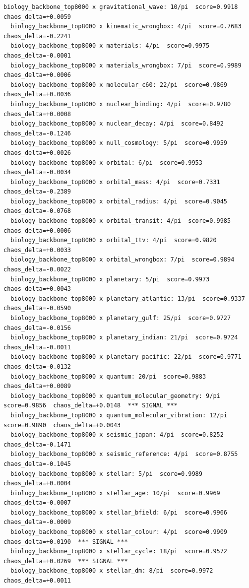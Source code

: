 \documentclass[11pt, letterpaper, openany]{book}
\begin{document}
\begin{empiricalbox}
\begin{lstlisting}[style=terminal]
  biology_backbone_top8000 x gravitational_wave: 10/pi  score=0.9918  chaos_delta=+0.0059
  biology_backbone_top8000 x kinematic_wrongbox: 4/pi  score=0.7683  chaos_delta=-0.2241
  biology_backbone_top8000 x materials: 4/pi  score=0.9975  chaos_delta=-0.0001
  biology_backbone_top8000 x materials_wrongbox: 7/pi  score=0.9989  chaos_delta=+0.0006
  biology_backbone_top8000 x molecular_c60: 22/pi  score=0.9869  chaos_delta=+0.0036
  biology_backbone_top8000 x nuclear_binding: 4/pi  score=0.9780  chaos_delta=+0.0008
  biology_backbone_top8000 x nuclear_decay: 4/pi  score=0.8492  chaos_delta=-0.1246
  biology_backbone_top8000 x null_cosmology: 5/pi  score=0.9959  chaos_delta=+0.0026
  biology_backbone_top8000 x orbital: 6/pi  score=0.9953  chaos_delta=-0.0034
  biology_backbone_top8000 x orbital_mass: 4/pi  score=0.7331  chaos_delta=-0.2389
  biology_backbone_top8000 x orbital_radius: 4/pi  score=0.9045  chaos_delta=-0.0768
  biology_backbone_top8000 x orbital_transit: 4/pi  score=0.9985  chaos_delta=+0.0006
  biology_backbone_top8000 x orbital_ttv: 4/pi  score=0.9820  chaos_delta=+0.0033
  biology_backbone_top8000 x orbital_wrongbox: 7/pi  score=0.9894  chaos_delta=-0.0022
  biology_backbone_top8000 x planetary: 5/pi  score=0.9973  chaos_delta=+0.0043
  biology_backbone_top8000 x planetary_atlantic: 13/pi  score=0.9337  chaos_delta=-0.0590
  biology_backbone_top8000 x planetary_gulf: 25/pi  score=0.9727  chaos_delta=-0.0156
  biology_backbone_top8000 x planetary_indian: 21/pi  score=0.9724  chaos_delta=-0.0011
  biology_backbone_top8000 x planetary_pacific: 22/pi  score=0.9771  chaos_delta=-0.0132
  biology_backbone_top8000 x quantum: 20/pi  score=0.9883  chaos_delta=+0.0089
  biology_backbone_top8000 x quantum_molecular_geometry: 9/pi  score=0.9856  chaos_delta=+0.0148  *** SIGNAL ***
  biology_backbone_top8000 x quantum_molecular_vibration: 12/pi  score=0.9890  chaos_delta=+0.0043
  biology_backbone_top8000 x seismic_japan: 4/pi  score=0.8252  chaos_delta=-0.1471
  biology_backbone_top8000 x seismic_reference: 4/pi  score=0.8755  chaos_delta=-0.1045
  biology_backbone_top8000 x stellar: 5/pi  score=0.9989  chaos_delta=+0.0004
  biology_backbone_top8000 x stellar_age: 10/pi  score=0.9969  chaos_delta=-0.0007
  biology_backbone_top8000 x stellar_bfield: 6/pi  score=0.9966  chaos_delta=-0.0009
  biology_backbone_top8000 x stellar_colour: 4/pi  score=0.9909  chaos_delta=+0.0190  *** SIGNAL ***
  biology_backbone_top8000 x stellar_cycle: 18/pi  score=0.9572  chaos_delta=+0.0269  *** SIGNAL ***
  biology_backbone_top8000 x stellar_dm: 8/pi  score=0.9972  chaos_delta=+0.0011

\end{lstlisting}
\end{empiricalbox}
\end{document}
